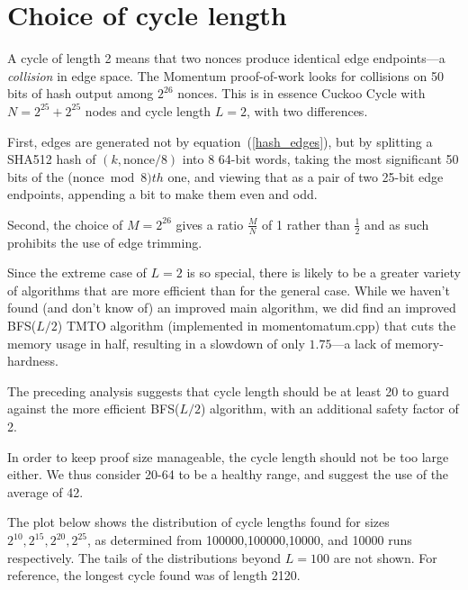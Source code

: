 \documentclass[11pt, oneside]{article}
\begin{document}
\section{Choice of cycle length}
\label{cycle_length_choice}
A cycle of length 2 means that two nonces produce identical edge endpoints---a {\em collision} in edge space.
The Momentum proof-of-work looks for collisions on 50 bits of hash output among $2^{26}$ nonces.
This is in essence Cuckoo Cycle with $N=2^{25}+2^{25}$ nodes and cycle length $L=2$, with
two differences.

First, edges are generated not by equation~(\ref{hash_edges}), but by splitting a SHA512 hash of
$(k,\mbox{nonce} / 8)$ into 8 64-bit words, taking the most significant 50 bits of the
($\mbox{nonce} \bmod 8)th$ one, and viewing that as a pair of two 25-bit edge endpoints, appending
a bit to make them even and odd.

Second, the choice of $M=2^{26}$ gives a ratio $\frac{M}{N}$ of 1 rather than $\frac{1}{2}$ and as such
prohibits the use of edge trimming.

Since the extreme case of $L=2$ is so special, there is likely to be a greater variety of algorithms that are more
efficient than for the general case. While we haven't found (and don't know of) an improved main algorithm,
we did find an improved BFS($L/2$) TMTO algorithm (implemented in momentomatum.cpp)
that cuts the memory usage in half, resulting in a slowdown of only $1.75$---a lack of memory-hardness.

The preceding analysis suggests that cycle length should be at least 20 to guard against the more efficient
BFS($L/2$) algorithm, with an additional safety factor of 2.

In order to keep proof size manageable, the cycle length should not be too large either.
We thus consider 20-64 to be a healthy range, and suggest the use of the average of 42.

The plot below shows the distribution of cycle lengths found for sizes $2^{10},2^{15},2^{20},2^{25}$,
as determined from 100000,100000,10000, and 10000 runs respectively. The tails of the distributions
beyond $L=100$ are not shown. For reference, the longest cycle found was of length 2120.
\end{document}
